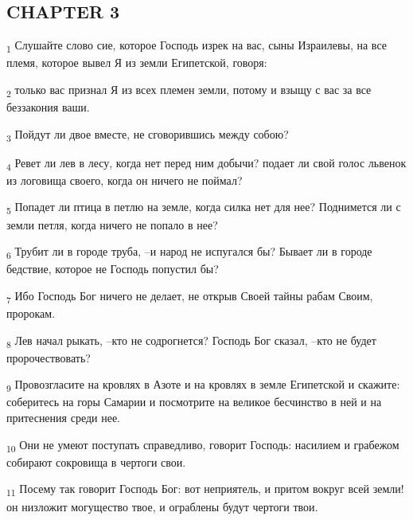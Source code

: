 \subsection{CHAPTER 3}
\begin{tcolorbox}
\textsubscript{1} Слушайте слово сие, которое Господь изрек на вас, сыны Израилевы, на все племя, которое вывел Я из земли Египетской, говоря:
\end{tcolorbox}
\begin{tcolorbox}
\textsubscript{2} только вас признал Я из всех племен земли, потому и взыщу с вас за все беззакония ваши.
\end{tcolorbox}
\begin{tcolorbox}
\textsubscript{3} Пойдут ли двое вместе, не сговорившись между собою?
\end{tcolorbox}
\begin{tcolorbox}
\textsubscript{4} Ревет ли лев в лесу, когда нет перед ним добычи? подает ли свой голос львенок из логовища своего, когда он ничего не поймал?
\end{tcolorbox}
\begin{tcolorbox}
\textsubscript{5} Попадет ли птица в петлю на земле, когда силка нет для нее? Поднимется ли с земли петля, когда ничего не попало в нее?
\end{tcolorbox}
\begin{tcolorbox}
\textsubscript{6} Трубит ли в городе труба, --и народ не испугался бы? Бывает ли в городе бедствие, которое не Господь попустил бы?
\end{tcolorbox}
\begin{tcolorbox}
\textsubscript{7} Ибо Господь Бог ничего не делает, не открыв Своей тайны рабам Своим, пророкам.
\end{tcolorbox}
\begin{tcolorbox}
\textsubscript{8} Лев начал рыкать, --кто не содрогнется? Господь Бог сказал, --кто не будет пророчествовать?
\end{tcolorbox}
\begin{tcolorbox}
\textsubscript{9} Провозгласите на кровлях в Азоте и на кровлях в земле Египетской и скажите: соберитесь на горы Самарии и посмотрите на великое бесчинство в ней и на притеснения среди нее.
\end{tcolorbox}
\begin{tcolorbox}
\textsubscript{10} Они не умеют поступать справедливо, говорит Господь: насилием и грабежом собирают сокровища в чертоги свои.
\end{tcolorbox}
\begin{tcolorbox}
\textsubscript{11} Посему так говорит Господь Бог: вот неприятель, и притом вокруг всей земли! он низложит могущество твое, и ограблены будут чертоги твои.
\end{tcolorbox}

